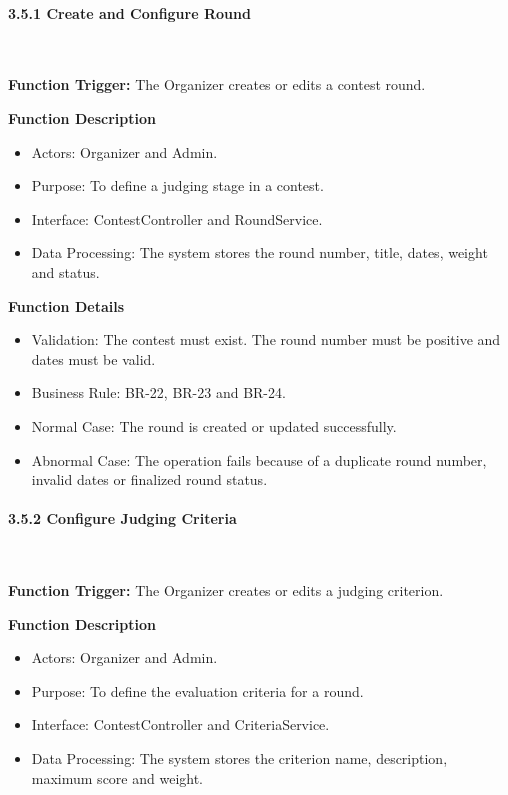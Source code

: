 \paragraph*{3.5.1 Create and Configure Round}\leavevmode\\[-0.5em]
\label{par:create-configure-round}

\textbf{Function Trigger:} The Organizer creates or edits a contest round.

\textbf{Function Description}
\begin{itemize}[leftmargin=1.5em, nosep]
    \item Actors: Organizer and Admin.
    \item Purpose: To define a judging stage in a contest.
    \item Interface: ContestController and RoundService.
    \item Data Processing: The system stores the round number, title, dates, weight and status.
\end{itemize}

\textbf{Function Details}
\begin{itemize}[leftmargin=1.5em, nosep]
    \item Validation: The contest must exist. The round number must be positive and dates must be valid.
    \item Business Rule: BR-22, BR-23 and BR-24.
    \item Normal Case: The round is created or updated successfully.
    \item Abnormal Case: The operation fails because of a duplicate round number, invalid dates or finalized round status.
\end{itemize}

\paragraph*{3.5.2 Configure Judging Criteria}\leavevmode\\[-0.5em]
\label{par:configure-judging-criteria}

\textbf{Function Trigger:} The Organizer creates or edits a judging criterion.

\textbf{Function Description}
\begin{itemize}[leftmargin=1.5em, nosep]
    \item Actors: Organizer and Admin.
    \item Purpose: To define the evaluation criteria for a round.
    \item Interface: ContestController and CriteriaService.
    \item Data Processing: The system stores the criterion name, description, maximum score and weight.
\end{itemize}

